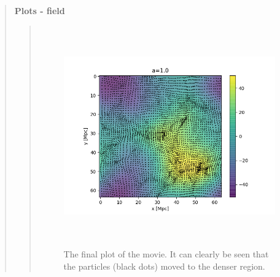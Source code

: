 \begin{quote}
\textbf{Plots - field}

\begin{quote}
\begin{figure}[!ht]
\centering
\includegraphics[width=14cm, height=9.5cm]{./Plots/4c/4c=89.png}
\caption{The final plot of the movie. It can clearly be seen that the particles (black dots) moved to the denser region. }
\label{FIG:stuff}
\end{figure}
\end{quote}
\newpage


\end{quote}

